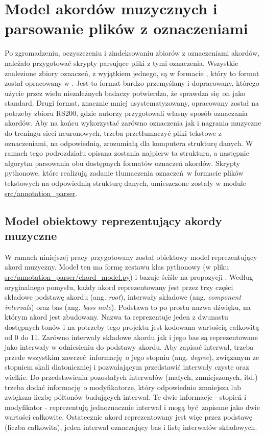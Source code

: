 \section{Model akordów muzycznych i parsowanie plików z oznaczeniami}

Po zgromadzeniu, oczyszczeniu i zindeksowaniu zbiorów z oznaczeniami akordów, należało przygotować
skrypty parsujące pliki z tymi oznaczenia. Wszystkie znalezione zbiory oznaczeń, z wyjątkiem
jednego, są w formacie , który to format został opracowany w \cite{harte_towards_nodate}.
Jest to format bardzo przemyślany i dopracowany, którego użycie przez wielu niezależnych badaczy
potwierdza, że sprawdza się on jako standard. Drugi format, znacznie mniej usystematyzowany,
opracowany został na potrzeby zbioru RS200, gdzie autorzy przygotowali własny sposób oznaczania
akordów. Aby na końcu wykorzystać zarówno oznaczenia jak i nagrania muzyczne do treningu sieci
neuronowych, trzeba przetłumaczyć pliki tekstowe z oznaczeniami, na odpowiednią, zrozumiałą dla
komputera strukturę danych. W ramach tego podrozdziału opisana zostania najpierw ta struktura, a
następnie algorytm parsowania obu dostępnych formatów oznaczeń akordów. Skrypty pythonowe, które
realizują zadanie tłumaczenia oznaczeń w formacie plików tekstowych na odpowiednią strukturę danych,
umieszczone zostały w module \url{src/annotation\_parser}.

\subsection{Model obiektowy reprezentujący akordy muzyczne}

W ramach niniejszej pracy przygotowany został obiektowy model reprezentujący akord muzyczny. Model
ten ma formę zestawu klas pythonowy (w pliku \url{src/annotation\_parser/chord\_model.py}) i bazuje
ściśle na propozycji \cite{harte_towards_nodate}. Według oryginalnego pomysłu, każdy akord
reprezentowany jest przez trzy części składowe podstawę akordu (ang. \emph{root}), interwały
składowe (ang. \emph{component intervals}) oraz bas (ang. \emph{bass note}). Podstawa to po prostu
nazwa dźwięku, na którym akord jest zbudowany. Nazwa ta reprezentuje jeden z dwunastu dostępnych
tonów i na potrzeby tego projektu jest kodowana wartością całkowitą od 0 do 11. Zarówno interwały
składowe akordu jak i jego bas są reprezentowane jako interwały w odniesieniu do podstawy akordu.
Aby zapisać interwał, trzeba przede wszystkim zawrzeć informację o jego stopniu (ang.
\emph{degree}), związanym ze stopniem skali diatoniczniej i pozwalającym przedstawić interwały czyste oraz
wielkie. Do przedstawienia pozostałych interwałów (małych, zmniejszonych, itd.) trzeba dodać
informację o modyfikatorze, który odpowiednio zmniejsza lub zwiększa liczbę półtonów budujących
interwał. Te dwie informacje - stopień i modyfikator - reprezentują jednoznacznie interwał i mogą
być zapisane jako dwie wartości całkowite. Ostatecznie akord reprezentowany jest więc przez podstawę
(liczba całkowita), jeden interwał oznaczający bas i listę interwałów składowych.

